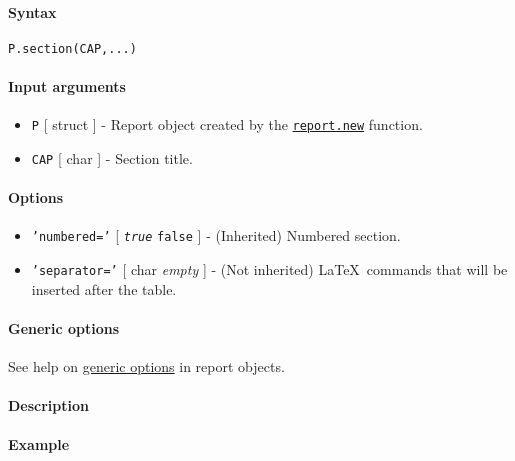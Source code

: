 


	\paragraph{Syntax}

\begin{verbatim}
P.section(CAP,...)
\end{verbatim}

\paragraph{Input arguments}

\begin{itemize}
\item
  \texttt{P} {[} struct {]} - Report object created by the
  \href{report/new}{\texttt{report.new}} function.
\item
  \texttt{CAP} {[} char {]} - Section title.
\end{itemize}

\paragraph{Options}

\begin{itemize}
\item
  \texttt{'numbered='} {[} \emph{\texttt{true}} \textbar{}
  \texttt{false} {]} - (Inherited) Numbered section.
\item
  \texttt{'separator='} {[} char \textbar{} \emph{empty} {]} - (Not
  inherited) \LaTeX~commands that will be inserted after the table.
\end{itemize}

\paragraph{Generic options}

See help on \href{report/Contents}{generic options} in report objects.

\paragraph{Description}

\paragraph{Example}


